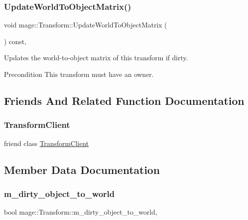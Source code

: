 \subsubsection{\texorpdfstring{Update\+World\+To\+Object\+Matrix()}{UpdateWorldToObjectMatrix()}}
{\footnotesize\ttfamily void mage\+::\+Transform\+::\+Update\+World\+To\+Object\+Matrix (\begin{DoxyParamCaption}{ }\end{DoxyParamCaption}) const\hspace{0.3cm}{\ttfamily [private]}, {\ttfamily [noexcept]}}

Updates the world-\/to-\/object matrix of this transform if dirty.

\begin{DoxyPrecond}{Precondition}
This transform must have an owner. 
\end{DoxyPrecond}


\subsection{Friends And Related Function Documentation}
\mbox{\label{classmage_1_1_transform_af7bc9408e1e31d66cb7fd971ff437a3a}} 
\subsubsection{\texorpdfstring{Transform\+Client}{TransformClient}}
{\footnotesize\ttfamily friend class \mbox{\hyperlink{classmage_1_1_transform_client}{Transform\+Client}}\hspace{0.3cm}{\ttfamily [friend]}}



\subsection{Member Data Documentation}
\mbox{\label{classmage_1_1_transform_a37b39fe67eaf4dc64d4b2c87b8868c4e}} 
\subsubsection{\texorpdfstring{m\+\_\+dirty\+\_\+object\+\_\+to\+\_\+world}{m\_dirty\_object\_to\_world}}
{\footnotesize\ttfamily bool mage\+::\+Transform\+::m\+\_\+dirty\+\_\+object\+\_\+to\+\_\+world\hspace{0.3cm}{\ttfamily [mutable]}, {\ttfamily [private]}}

